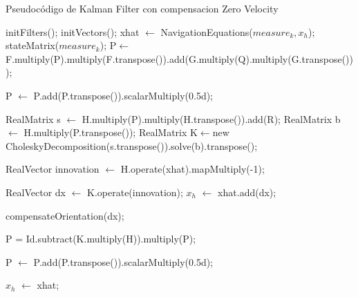 \begin{algorithm}[H] 
\caption{Pseudocódigo de Kalman Filter con compensacion Zero Velocity} \label{pseudo-code-kf}
\begin{algorithmic}[1]
        \State initFilters();
        \State initVectors();
    \EndFunction
    \Statex
        \Statex
        \State xhat $\gets$ NavigationEquations($measure_k, x_h$);
        \Statex
        \State stateMatrix($measure_k$); 
        \Statex
        \State P$\gets$F.multiply(P).multiply(F.transpose()).add(G.multiply(Q).multiply(G.transpose())); 
        
        \State P $\gets$ P.add(P.transpose()).scalarMultiply(0.5d);
        
        \Statex

                \Statex 
                \State RealMatrix s $\gets$ H.multiply(P).multiply(H.transpose()).add(R);
                \State RealMatrix b $\gets$ H.multiply(P.transpose());
                \State RealMatrix K$\gets$new CholeskyDecomposition(s.transpose()).solve(b).transpose();

               \Statex
               \State RealVector innovation $\gets$ H.operate(xhat).mapMultiply(-1);

               \State RealVector dx $\gets$ K.operate(innovation);
               \State $x_h$ $\gets$ xhat.add(dx);
               
               \Statex {}
               \State compensateOrientation(dx);
               
               \Statex
               \State P = Id.subtract(K.multiply(H)).multiply(P);
               
               \Statex
               \State P $\gets$ P.add(P.transpose()).scalarMultiply(0.5d);

        \Else
            \State $x_h$ $\gets$ xhat; 
        \EndIf

    \EndFunction

\end{algorithmic}
\end{algorithm}
 
